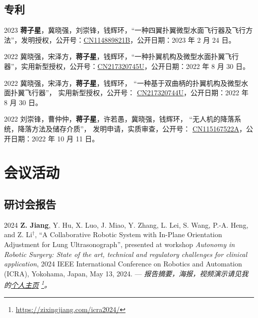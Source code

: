 \documentclass[utf8, 11pt,letterpaper]{report}
\begin{document}
\subsection*{专利}
\begin{tablist}		
	\item[2023]   \tab{}\textbf{蒋子星}，冀晓强，刘崇锋，钱辉环，``一种四翼扑翼微型水面飞行器及飞行方法''，发明授权，公开号：\href{https://www.patentguru.com/cn/CN114889821B}{CN114889821B}，公开日期：2023 年 2 月 24 日。
	
	\item[2022]   \tab{}冀晓强，宋泽方，\textbf{蒋子星}，钱辉环，``一种扑翼机构及微型水面扑翼飞行器''，实用新型授权，公开号：\href{https://www.patentguru.com/cn/CN217320745U}{CN217320745U}，公开日期：2022 年 8 月 30 日。 
	
	\item[2022]   \tab{}冀晓强，宋泽方，\textbf{蒋子星}，钱辉环， ``一种基于双曲柄的扑翼机构及微型水面扑翼飞行器''， 实用新型授权，公开号： \href{https://www.patentguru.com/cn/CN217320744U}{CN217320744U}，公开日期：2022 年 8 月 30 日。 
	
	\item[2022]   \tab{}刘崇锋，曹仲仲，\textbf{蒋子星}，许若愚，冀晓强，钱辉环， ``无人机的降落系统，降落方法及储存介质''， 发明申请，实质审查，公开号： \href{https://www.patentguru.com/cn/CN115167522A}{CN115167522A}，公开日期：2022 年 10 月 11 日。
\end{tablist}
	
	
	
\section*{会议活动}
\subsection*{研讨会报告}
\begin{tablist}
	\item[2024] \tab \textbf{Z. Jiang}, Y. Hu, X. Luo, J. Miao, Y. Zhang, L. Lei, S. Wang, P.-A. Heng, and Z. Li$^\dagger$, ``A Collaborative Robotic System with In-Plane Orientation Adjustment for Lung Ultrasonograph'', presented at workshop \textit{Autonomy in Robotic Surgery: State of the art, technical and regulatory challenges for clinical application}, 2024 IEEE International Conference on Robotics and Automation (ICRA), Yokohama, Japan, May 13, 2024. --- \emph{报告摘要，海报，视频演示请见我的\href{https://zixingjiang.com/icra2024/}{个人主页} \footnote{\href{https://zixingjiang.com/icra2024/}{https://zixingjiang.com/icra2024/}}。}
\end{tablist}
	
\end{document}
